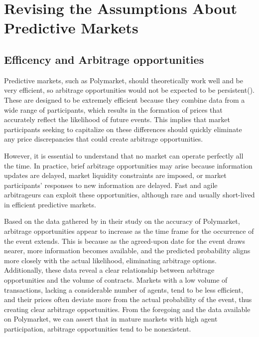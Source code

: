 \section{Revising the Assumptions About Predictive Markets}
\label{sec:revising_assumptions}

\subsection{Efficency and Arbitrage opportunities}
\label{subsec:efficency_and_arbitrage_opportunities}

Predictive markets, such as Polymarket, should theoretically work well and be very efficient, so arbitrage opportunities would not be expected to be persistent(\citeauthor{luckner2008arbitrage}). These are designed to be extremely efficient because they combine data from a wide range of participants, which results in the formation of prices that accurately reflect the likelihood of future events. This implies that market participants seeking to capitalize on these differences should quickly eliminate any price discrepancies that could create arbitrage opportunities.

However, it is essential to understand that no market can operate perfectly all the time. In practice, brief arbitrage opportunities may arise because information updates are delayed, market liquidity constraints are imposed, or market participants' responses to new information are delayed. Fast and agile arbitrageurs can exploit these opportunities, although rare and usually short-lived in efficient predictive markets.

Based on the data gathered by \citeauthor{kapp2023improved} in their study on the accuracy of Polymarket, arbitrage opportunities appear to increase as the time frame for the occurrence of the event extends. This is because as the agreed-upon date for the event draws nearer, more information becomes available, and the predicted probability aligns more closely with the actual likelihood, eliminating arbitrage options. Additionally, these data reveal a clear relationship between arbitrage opportunities and the volume of contracts. Markets with a low volume of transactions, lacking a considerable number of agents, tend to be less efficient, and their prices often deviate more from the actual probability of the event, thus creating clear arbitrage opportunities. From the foregoing and the data available on Polymarket, we can assert that in mature markets with high agent participation, arbitrage opportunities tend to be nonexistent.


